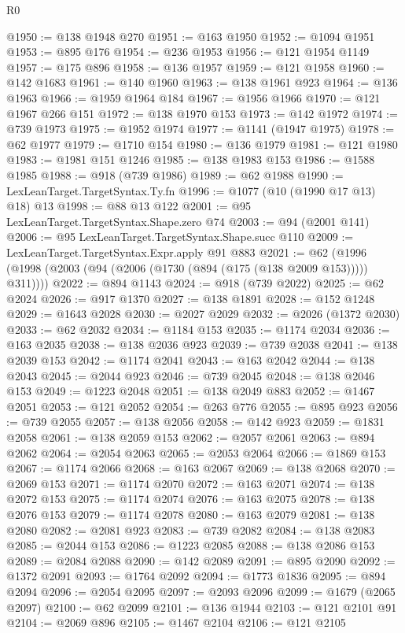 \begin{lexlean}{R0}
\begin{coremodule}
@1950 := @138 @1948 @270
@1951 := @163 @1950
@1952 := @1094 @1951
@1953 := @895 @176
@1954 := @236 @1953
@1956 := @121 @1954 @1149
@1957 := @175 @896
@1958 := @136 @1957
@1959 := @121 @1958
@1960 := @142 @1683
@1961 := @140 @1960
@1963 := @138 @1961 @923
@1964 := @136 @1963
@1966 := @1959 @1964 @184
@1967 := @1956 @1966
@1970 := @121 @1967 @266 @151
@1972 := @138 @1970 @153
@1973 := @142 @1972
@1974 := @739 @1973
@1975 := @1952 @1974
@1977 := @1141 (@1947 @1975)
@1978 := @62 @1977
@1979 := @1710 @154
@1980 := @136 @1979
@1981 := @121 @1980
@1983 := @1981 @151 @1246
@1985 := @138 @1983 @153
@1986 := @1588 @1985
@1988 := @918 (@739 @1986)
@1989 := @62 @1988
@1990 := LexLeanTarget.TargetSyntax.Ty.fn
@1996 := @1077 (@10 (@1990 @17 @13) @18) @13
@1998 := @88 @13 @122
@2001 := @95 LexLeanTarget.TargetSyntax.Shape.zero @74
@2003 := @94 (@2001 @141)
@2006 := @95 LexLeanTarget.TargetSyntax.Shape.succ @110
@2009 := LexLeanTarget.TargetSyntax.Expr.apply @91 @883
@2021 := @62 (@1996 (@1998 (@2003 (@94 (@2006 (@1730 (@894 (@175 (@138 @2009 @153))))) @311))))
@2022 := @894 @1143
@2024 := @918 (@739 @2022)
@2025 := @62 @2024
@2026 := @917 @1370
@2027 := @138 @1891
@2028 := @152 @1248
@2029 := @1643 @2028
@2030 := @2027 @2029
@2032 := @2026 (@1372 @2030)
@2033 := @62 @2032
@2034 := @1184 @153
@2035 := @1174 @2034
@2036 := @163 @2035
@2038 := @138 @2036 @923
@2039 := @739 @2038
@2041 := @138 @2039 @153
@2042 := @1174 @2041
@2043 := @163 @2042
@2044 := @138 @2043
@2045 := @2044 @923
@2046 := @739 @2045
@2048 := @138 @2046 @153
@2049 := @1223 @2048
@2051 := @138 @2049 @883
@2052 := @1467 @2051
@2053 := @121 @2052
@2054 := @263 @776
@2055 := @895 @923
@2056 := @739 @2055
@2057 := @138 @2056
@2058 := @142 @923
@2059 := @1831 @2058
@2061 := @138 @2059 @153
@2062 := @2057 @2061
@2063 := @894 @2062
@2064 := @2054 @2063
@2065 := @2053 @2064
@2066 := @1869 @153
@2067 := @1174 @2066
@2068 := @163 @2067
@2069 := @138 @2068
@2070 := @2069 @153
@2071 := @1174 @2070
@2072 := @163 @2071
@2074 := @138 @2072 @153
@2075 := @1174 @2074
@2076 := @163 @2075
@2078 := @138 @2076 @153
@2079 := @1174 @2078
@2080 := @163 @2079
@2081 := @138 @2080
@2082 := @2081 @923
@2083 := @739 @2082
@2084 := @138 @2083
@2085 := @2044 @153
@2086 := @1223 @2085
@2088 := @138 @2086 @153
@2089 := @2084 @2088
@2090 := @142 @2089
@2091 := @895 @2090
@2092 := @1372 @2091
@2093 := @1764 @2092
@2094 := @1773 @1836
@2095 := @894 @2094
@2096 := @2054 @2095
@2097 := @2093 @2096
@2099 := @1679 (@2065 @2097)
@2100 := @62 @2099
@2101 := @136 @1944
@2103 := @121 @2101 @91
@2104 := @2069 @896
@2105 := @1467 @2104
@2106 := @121 @2105

\end{coremodule}
\end{lexlean}
